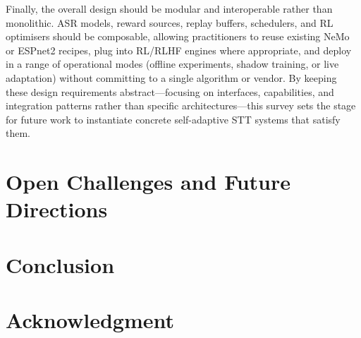 \documentclass[conference]{IEEEtran}
\begin{document}
Finally, the overall design should be modular and interoperable rather than monolithic.
ASR models, reward sources, replay buffers, schedulers, and RL optimisers should be composable, allowing practitioners to reuse existing NeMo or ESPnet2 recipes, plug into RL/RLHF engines where appropriate, and deploy in a range of operational modes (offline experiments, shadow training, or live adaptation) without committing to a single algorithm or vendor.
By keeping these design requirements abstract—focusing on interfaces, capabilities, and integration patterns rather than specific architectures—this survey sets the stage for future work to instantiate concrete self-adaptive STT systems that satisfy them.


\section{Open Challenges and Future Directions}


\section{Conclusion}

\section*{Acknowledgment}


\end{document}
